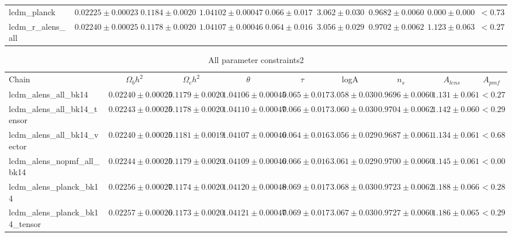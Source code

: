 \documentclass[preprint]{emulateapj}
\begin{document}
\begin{table}[h]
\begin{center}
\begin{tabular}{l || c c c c c c c | c}
lcdm\_planck & $ 0.02225\pm  0.00023$ & $ 0.1184\pm  0.0020$ & $ 1.04102\pm  0.00047$ & $ 0.066\pm  0.017$ & $ 3.062\pm  0.030$ & $ 0.9682\pm  0.0060$ & $ 0.000 \pm  0.000$ & $< 0.73$ \\
lcdm\_r\_alens\_all & $ 0.02240\pm  0.00025$ & $ 0.1178\pm  0.0020$ & $ 1.04107\pm  0.00046$ & $ 0.064\pm  0.016$ & $ 3.056\pm  0.029$ & $ 0.9702\pm  0.0062$ & $ 1.123 \pm  0.063$ & $< 0.27$ \\
\end{tabular}
 \normalsize
\end{center}
\end{table}


\begin{table}[h]
\begin{center}
\caption{\label{tab:param_all2} All parameter constraints2}
\tiny
\begin{tabular}{l || c c c c c c c | c}
Chain & $\Omega_b h^2$  & $\Omega_c h^2$  & $\theta$  & $\tau$  & logA  & $n_s$  & $A_{lens}$  & $A_{pmf}$ \\
lcdm\_alens\_all\_bk14 & $ 0.02240\pm  0.00025$ & $ 0.1179\pm  0.0020$ & $ 1.04106\pm  0.00045$ & $ 0.065\pm  0.017$ & $ 3.058\pm  0.030$ & $ 0.9696\pm  0.0060$ & $ 1.131 \pm  0.061$ & $< 0.27$ \\
lcdm\_alens\_all\_bk14\_tensor & $ 0.02243\pm  0.00025$ & $ 0.1178\pm  0.0020$ & $ 1.04110\pm  0.00047$ & $ 0.066\pm  0.017$ & $ 3.060\pm  0.030$ & $ 0.9704\pm  0.0062$ & $ 1.142 \pm  0.060$ & $< 0.29$ \\
lcdm\_alens\_all\_bk14\_vector & $ 0.02240\pm  0.00025$ & $ 0.1181\pm  0.0019$ & $ 1.04107\pm  0.00046$ & $ 0.064\pm  0.016$ & $ 3.056\pm  0.029$ & $ 0.9687\pm  0.0061$ & $ 1.134 \pm  0.061$ & $< 0.68$ \\
lcdm\_alens\_nopmf\_all\_bk14 & $ 0.02244\pm  0.00025$ & $ 0.1179\pm  0.0020$ & $ 1.04109\pm  0.00046$ & $ 0.066\pm  0.016$ & $ 3.061\pm  0.029$ & $ 0.9700\pm  0.0060$ & $ 1.145 \pm  0.061$ & $< 0.00$ \\
lcdm\_alens\_planck\_bk14 & $ 0.02256\pm  0.00027$ & $ 0.1174\pm  0.0020$ & $ 1.04120\pm  0.00048$ & $ 0.069\pm  0.017$ & $ 3.068\pm  0.030$ & $ 0.9723\pm  0.0062$ & $ 1.188 \pm  0.066$ & $< 0.28$ \\
lcdm\_alens\_planck\_bk14\_tensor & $ 0.02257\pm  0.00026$ & $ 0.1173\pm  0.0020$ & $ 1.04121\pm  0.00047$ & $ 0.069\pm  0.017$ & $ 3.067\pm  0.030$ & $ 0.9727\pm  0.0060$ & $ 1.186 \pm  0.065$ & $< 0.29$ \\

\end{tabular}
\end{center}
\end{table}
\end{document}
